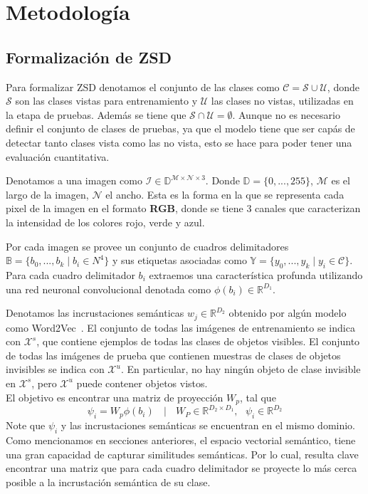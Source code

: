 \chapter{Metodología}\label{cap:metodologia}

\section{Formalización de ZSD} \label{ssec:formalizaciondezsd}
Para formalizar ZSD denotamos el conjunto de las clases como $\mathcal{C} = \mathcal{S} \cup \mathcal{U}$, donde $\mathcal{S}$ son las clases vistas para entrenamiento y $\mathcal{U}$ las clases no vistas, utilizadas en la etapa de pruebas. Además se tiene que $\mathcal{S} \cap \mathcal{U} = \emptyset$. Aunque no es necesario definir el conjunto de clases de pruebas, ya que el modelo tiene que ser capás de detectar tanto clases vista como las no vista, esto se hace para poder tener una evaluación cuantitativa.

Denotamos a una imagen como $\mathcal{I} \in \mathbb{D}^{\mathcal{M} \times \mathcal{N} \times 3}$. Donde $\mathbb{D} = \{0,...,255\}$, $\mathcal{M}$  es el largo de la imagen, $\mathcal{N}$ el ancho. Esta es la forma en la que se representa cada pixel de la imagen en el formato \textbf{RGB}, donde se tiene 3 canales que caracterizan la intensidad de los colores rojo, verde y azul. 

Por cada imagen se provee un conjunto de cuadros delimitadores  $\mathbb{B} = \{b_0,...,b_k\mid b_i \in N^4\}$ y sus etiquetas asociadas como $\mathbb{Y} = \{y_0,...,y_k\mid y_i \in \mathcal{C}\}$. Para cada cuadro delimitador $b_i$ extraemos una característica profunda utilizando una red neuronal convolucional denotada como $\phi(b_i) \in \mathbb{R}^{D_1}$. 

Denotamos las incrustaciones semánticas $w_j \in \mathbb{R}^{D_2}$ obtenido por algún modelo como Word2Vec~\cite{mikolov2013distributed}. El conjunto de todas las imágenes de entrenamiento se indica con $\mathcal{X}^s$, que contiene ejemplos de todas las clases de objetos visibles.  El conjunto de todas las imágenes de prueba que contienen muestras de clases de objetos invisibles se indica con  $\mathcal{X}^u$. En particular, no hay ningún objeto de clase invisible en $\mathcal{X}^s$, pero $\mathcal{X}^u$ puede contener objetos vistos.\\

El objetivo es encontrar una matriz de proyección $W_p$, tal que \[ \psi_i = W_p\phi(b_i) \:\:\:\mid\:\:\: W_P \in \mathbb{R}^{D_2 \times D_1},\:\:\: \psi_i \in \mathbb{R}^{D_2} \] Note que $\psi_i$ y las incrustaciones semánticas se encuentran en el mismo dominio. Como mencionamos en secciones anteriores, el espacio vectorial semántico, tiene una gran capacidad de capturar similitudes semánticas. Por lo cual, resulta clave encontrar una matriz que para cada cuadro delimitador se proyecte lo más cerca posible a la incrustación semántica de su clase. 

